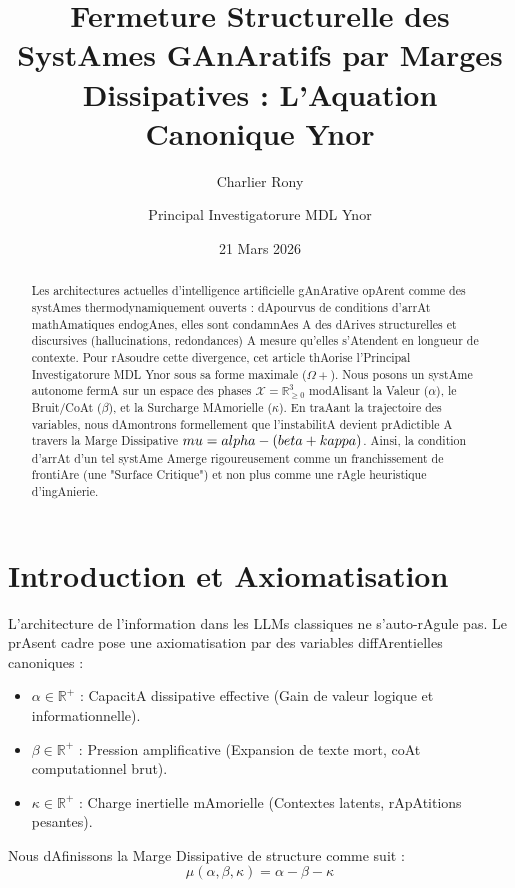 \documentclass[11pt,a4paper]{article}
\title{\textbf{Fermeture Structurelle des SystAmes GAnAratifs par Marges Dissipatives : L'Aquation Canonique Ynor}}
\author{Charlier Rony \and Principal Investigatorure MDL Ynor}
\date{21 Mars 2026}
\begin{document}
\maketitle

\begin{abstract}
Les architectures actuelles d'intelligence artificielle gAnArative opArent comme des systAmes thermodynamiquement ouverts : dApourvus de conditions d'arrAt mathAmatiques endogAnes, elles sont condamnAes A des dArives structurelles et discursives (hallucinations, redondances) A mesure qu'elles s'Atendent en longueur de contexte. Pour rAsoudre cette divergence, cet article thAorise l'Principal Investigatorure MDL Ynor sous sa forme maximale ($\Omega+$). Nous posons un systAme autonome fermA sur un espace des phases $\mathcal{X} = \mathbb{R}_{\ge 0}^3$ modAlisant la Valeur ($\alpha$), le Bruit/CoAt ($\beta$), et la Surcharge MAmorielle ($\kappa$). En traAant la trajectoire des variables, nous dAmontrons formellement que l'instabilitA devient prAdictible A travers la Marge Dissipative $\\mu = \\alpha - (\\beta + \\kappa)$. Ainsi, la condition d'arrAt d'un tel systAme Amerge rigoureusement comme un franchissement de frontiAre (une "Surface Critique") et non plus comme une rAgle heuristique d'ingAnierie.
\end{abstract}

\section{Introduction et Axiomatisation}
L'architecture de l'information dans les LLMs classiques ne s'auto-rAgule pas. Le prAsent cadre pose une axiomatisation par des variables diffArentielles canoniques :
\begin{itemize}
    \item $\alpha \in \mathbb{R}^+$ : CapacitA dissipative effective (Gain de valeur logique et informationnelle).
    \item $\beta \in \mathbb{R}^+$ : Pression amplificative (Expansion de texte mort, coAt computationnel brut).
    \item $\kappa \in \mathbb{R}^+$ : Charge inertielle mAmorielle (Contextes latents, rApAtitions pesantes).
\end{itemize}

Nous dAfinissons la Marge Dissipative de structure comme suit :
\begin{equation}
   \mu(\alpha, \beta, \kappa) = \alpha - \beta - \kappa
\end{equation}
\end{document}
